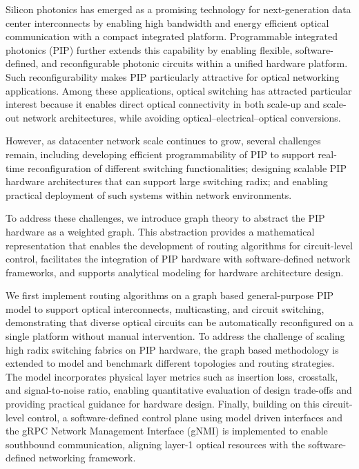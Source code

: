 %
%

Silicon photonics has emerged as a promising technology for next-generation data center interconnects by enabling high bandwidth and energy efficient optical communication with a compact integrated platform.
Programmable integrated photonics (PIP) further extends this capability by enabling flexible, software-defined, and reconfigurable photonic circuits within a unified hardware platform.
Such reconfigurability makes PIP particularly attractive for optical networking applications.
Among these applications, optical switching has attracted particular interest because it enables direct optical connectivity in both scale-up and scale-out network architectures, while avoiding optical–electrical–optical conversions.

However, as datacenter network scale continues to grow, several challenges remain, including developing efficient programmability of PIP to support real-time reconfiguration of different switching functionalities;
designing scalable PIP hardware architectures that can support large switching radix; and enabling practical deployment of such systems within network environments.

To address these challenges, we introduce graph theory to abstract the PIP hardware as a weighted graph.
This abstraction provides a mathematical representation that enables the development of routing algorithms for circuit-level control, facilitates the integration of PIP hardware with software-defined network frameworks,
and supports analytical modeling for hardware architecture design.

We first implement routing algorithms on a graph based general-purpose PIP model to support optical interconnects, multicasting, and circuit switching, demonstrating that diverse optical circuits can be automatically reconfigured on a single platform without manual intervention.
To address the challenge of scaling high radix switching fabrics on PIP hardware, the graph based methodology is extended to model and benchmark different topologies and routing strategies.
The model incorporates physical layer metrics such as insertion loss, crosstalk, and signal-to-noise ratio, enabling quantitative evaluation of design trade-offs and providing practical guidance for hardware design.
Finally, building on this circuit-level control, a software-defined control plane using model driven interfaces and the gRPC Network Management Interface (gNMI) is implemented to enable southbound communication, aligning layer-1 optical resources with the software-defined networking framework.

